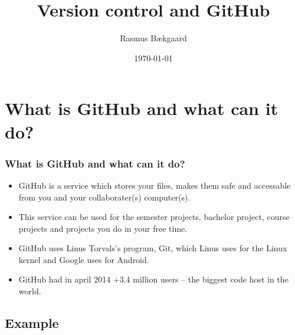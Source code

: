 \documentclass{beamer}
\begin{document}
\title{Version control and GitHub}  
\author{Rasmus Bækgaard}
\date{\today} 





\section{What is GitHub and what can it do?}
\frame
{
	\frametitle{What is GitHub and what can it do?}
	
\begin{itemize}
\item GitHub is a service which stores your files, makes them safe and 
accessable from you and your collaborater(s) computer(s).

\item This service can be used for the semester projects, bachelor project, 
course projects and projects you do in your free time.

\item GitHub uses Linus Torvals's program, Git, which Linus uses for the Linux 
kernel and Google uses for Android.

\item GitHub had in april 2014 +3.4 million users -- the biggest code host in 
the world.
\end{itemize}

}

\subsection{Example}

\end{document}
